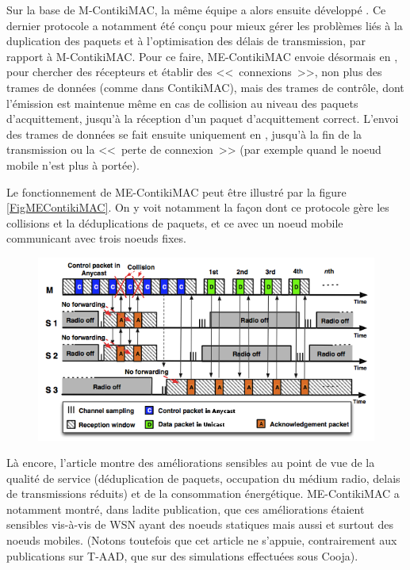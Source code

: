 \medskip

Sur la base de M-ContikiMAC, la même équipe a alors ensuite développé
. Ce dernier protocole a notamment été conçu pour mieux
gérer les problèmes liés à la duplication des paquets et à l'optimisation
des délais de transmission, par rapport à M-ContikiMAC. Pour ce faire,
ME-ContikiMAC envoie désormais en , pour chercher
des récepteurs et établir des <<~connexions~>>, non plus des trames
de données (comme dans ContikiMAC), mais des trames de contrôle, dont
l'émission est maintenue même en cas de collision au niveau des paquets
d'acquittement, jusqu'à la réception d'un paquet d'acquittement correct.
L'envoi des trames de données se fait ensuite uniquement en
, jusqu'à la fin de la transmission ou la <<~perte
de connexion~>> (par exemple quand le noeud mobile n'est plus à portée).

Le fonctionnement de ME-ContikiMAC peut être illustré par la figure
\vref{FigMEContikiMAC}. On y voit notamment la façon dont ce protocole
gère les collisions et la déduplications de paquets, et ce avec
un noeud mobile communicant avec trois noeuds fixes.

\begin{figure}[!hbt]
\centering
\includegraphics[width=12.75cm]{images/ch3-me-contikimac.png}
\label{FigMEContikiMAC}
\end{figure}

Là encore, l'article \cite{ME-ContikiMAC} montre des améliorations
sensibles au point de vue de la qualité de service (déduplication de
paquets, occupation du médium radio, delais de transmissions réduits)
et de la consommation énergétique. ME-ContikiMAC a notamment montré,
dans ladite publication, que ces améliorations étaient sensibles vis-à-vis
de WSN ayant des noeuds statiques mais aussi et surtout des noeuds
mobiles. (Notons toutefois que cet article ne s'appuie, contrairement
aux publications sur T-AAD, que sur des simulations effectuées sous
Cooja).

